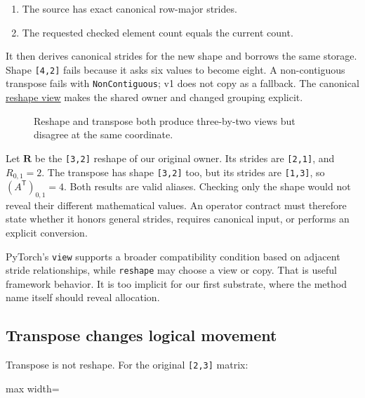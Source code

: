 \documentclass[
  10pt,
]{article}
\providecommand{\tightlist}{%
  \setlength{\itemsep}{0pt}\setlength{\parskip}{0pt}}
\begin{document}
\begin{enumerate}
\def\labelenumi{\arabic{enumi}.}
\tightlist
\item
  The source has exact canonical row-major strides.
\item
  The requested checked element count equals the current count.
\end{enumerate}

It then derives canonical strides for the new shape and borrows the same
storage. Shape \texttt{{[}4,2{]}} fails because it asks six values to
become eight. A non-contiguous transpose fails with
\texttt{NonContiguous}; v1 does not copy as a fallback. The canonical
\href{https://github.com/hermonai/inside-the-llm-engine/blob/astra-visual-rewrite/diagrams/tensor/reshape-view.txt}{reshape
view} makes the shared owner and changed grouping explicit.

\begin{figure}[H]\centering\resizebox{\linewidth}{!}{}\caption{Reshape and transpose both produce three-by-two views but disagree at the same coordinate.}\end{figure}

Let \(\mathbf{R}\) be the \texttt{{[}3,2{]}} reshape of our original
owner. Its strides are \texttt{{[}2,1{]}}, and \(R_{0,1}=2\). The
transpose has shape \texttt{{[}3,2{]}} too, but its strides are
\texttt{{[}1,3{]}}, so \((A^{\mathsf T})_{0,1}=4\). Both results are
valid aliases. Checking only the shape would not reveal their different
mathematical values. An operator contract must therefore state whether
it honors general strides, requires canonical input, or performs an
explicit conversion.

PyTorch's \texttt{view} supports a broader compatibility condition based
on adjacent stride relationships, while \texttt{reshape} may choose a
view or copy. That is useful framework behavior. It is too implicit for
our first substrate, where the method name itself should reveal
allocation.

\subsection{Transpose changes logical
movement}\label{transpose-changes-logical-movement}

Transpose is not reshape. For the original \texttt{{[}2,3{]}} matrix:

\begin{center}\begin{adjustbox}{max width=\linewidth}\end{adjustbox}\end{center}
\end{document}
